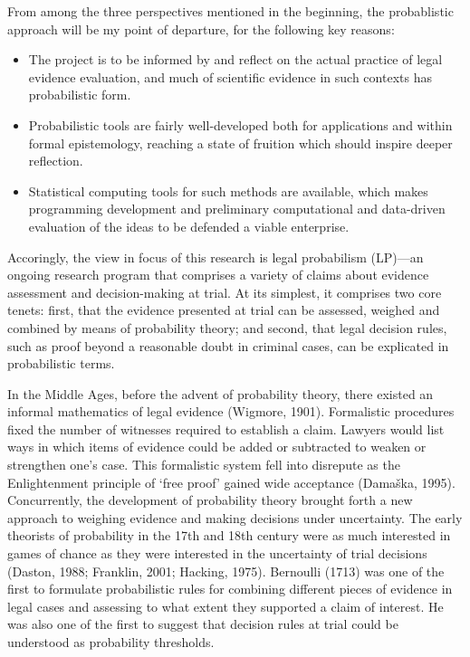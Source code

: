 \documentclass[11pt,dvipsnames,enabledeprecatedfontcommands]{scrartcl}
\begin{document}
From among the three perspectives mentioned in the beginning, the
probablistic approach will be my point of departure, for the following
key reasons:

\begin{itemize}
\item
  The project is to be informed by and reflect on the actual practice of
  legal evidence evaluation, and much of scientific evidence in such
  contexts has probabilistic form.
\item
  Probabilistic tools are fairly well-developed both for applications
  and within formal epistemology, reaching a state of fruition which
  should inspire deeper reflection.
\item
  Statistical computing tools for such methods are available, which
  makes programming development and preliminary computational and
  data-driven evaluation of the ideas to be defended a viable
  enterprise.
\end{itemize}

Accoringly, the view in focus of this research is legal probabilism
(LP)---an ongoing research program that comprises a variety of claims
about evidence assessment and decision-making at trial. At its simplest,
it comprises two core tenets: first, that the evidence presented at
trial can be assessed, weighed and combined by means of probability
theory; and second, that legal decision rules, such as proof beyond a
reasonable doubt in criminal cases, can be explicated in probabilistic
terms.

In the Middle Ages, before the advent of probability theory, there
existed an informal mathematics of legal evidence (Wigmore, 1901).
Formalistic procedures fixed the number of witnesses required to
establish a claim. Lawyers would list ways in which items of evidence
could be added or subtracted to weaken or strengthen one's case. This
formalistic system fell into disrepute as the Enlightenment principle of
`free proof' gained wide acceptance (Damaška, 1995). Concurrently, the
development of probability theory brought forth a new approach to
weighing evidence and making decisions under uncertainty. The early
theorists of probability in the 17th and 18th century were as much
interested in games of chance as they were interested in the uncertainty
of trial decisions (Daston, 1988; Franklin, 2001; Hacking, 1975).
Bernoulli (1713) was one of the first to formulate probabilistic rules
for combining different pieces of evidence in legal cases and assessing
to what extent they supported a claim of interest. He was also one of
the first to suggest that decision rules at trial could be understood as
probability thresholds.
\end{document}
